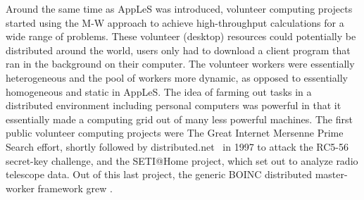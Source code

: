 \documentclass{sig-alternate}
\begin{document}





Around the same time as AppLeS was introduced, volunteer computing
projects started using the M-W approach to achieve high-throughput calculations
for a wide range of problems.
These volunteer (desktop) resources could potentially be distributed around the
world, users only had to download a client program that ran in the
background on their computer.
The volunteer workers were essentially heterogeneous and the pool of workers
more dynamic, as opposed to essentially homogeneous and static in AppLeS.
The idea of farming out tasks in a distributed environment including personal
computers was powerful in that it essentially made a computing grid out of many
less powerful machines.
The first public volunteer computing projects were The Great Internet Mersenne
Prime Search effort\cite{woltman:2004:gimps}, shortly followed by
distributed.net~\cite{Lawton:2000:distributednet} in 1997 to attack the RC5-56
secret-key challenge, and the SETI@Home project, which set out to analyze radio
telescope data.
Out of this last project, the generic BOINC distributed master-worker framework
grew \cite{Anderson:2004:BSP:1032646.1033223}.
\end{document}
